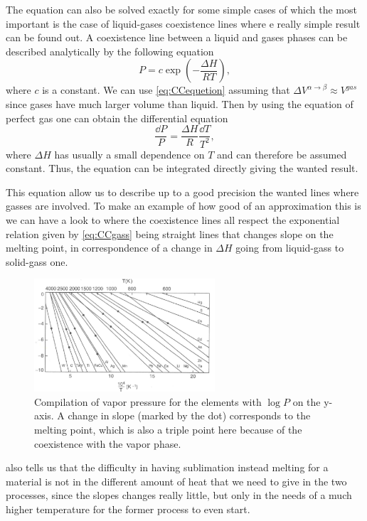 The equation can also be solved exactly for some simple cases of which the most important is the case of liquid-gases coexistence lines where e really simple result can be found out.
{
    A coexistence line between a liquid and gases phases can be described analytically by the following equation
    \begin{equation}
        \label{eq:CCgass}
        P = c\exp\left( -\frac{\Delta H}{RT} \right),
    \end{equation}
    where $c$ is a constant.
}
{
    We can use \eqref{eq:CCequetion} assuming that $\Delta V^{\alpha \to \beta} \approx V^{gas}$ since gases have much larger volume than liquid. Then by using the equation of perfect gas one can obtain the differential equation
    \begin{equation}
        \frac{\dd P}{P} = \frac{\Delta H}{R}\frac{\dd T}{T^2},
    \end{equation}
    where $\Delta H$ has usually a small dependence on $T$ and can therefore be assumed constant. Thus, the equation can be integrated directly giving the wanted result. 
}

\noindent
This equation allow us to describe up to a good precision the wanted lines where gasses are involved. To make an example of how good of an approximation this is we can have a look to  where the coexistence lines all respect the exponential relation given by \eqref{eq:CCgass} being straight lines that changes slope on the melting point, in correspondence of a change in $\Delta H$ going from liquid-gass to solid-gass one.
\begin{figure}[t]
    \centering
    \includegraphics[width=0.6\textwidth]{Immagini/CCexample.png}
    \caption{
        Compilation of vapor pressure for the elements with $\log P$ on the y-axis. A change in slope (marked by the dot) corresponds to the melting point, which is also a triple point here because of the coexistence with the vapor phase.
    }
    \label{fig:CCexample}
\end{figure}

\nt
{
     also tells us that the difficulty in having sublimation instead melting for a material is not in the different amount of heat that we need to give in the two processes, since the slopes changes really little, but only in the needs of a much higher temperature for the former process to even start.
}